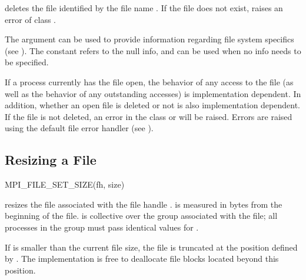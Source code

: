  deletes the file
identified by the file name .
If the file does not exist,  raises an
error of class .

The  argument can be used to provide information
regarding file system specifics
(see ).
The constant 
refers to the null info, and
can be used when no info needs to be specified.

If a process currently has the file open,
the behavior of any access to the file
(as well as the behavior of any outstanding accesses)
is implementation dependent.
In addition, whether an open file is deleted or not is also
implementation dependent.
If the file is not deleted,
an error in the class
 or  will be raised.
Errors are raised 
using the default file error handler
(see ).

\subsection{Resizing a File}
\label{sec:io-filecntl-resize}

%
%
\begin{funcdef}{MPI\_FILE\_SET\_SIZE}{(\mbox{fh}, \mbox{size})}
\end{funcdef}

 resizes the file
associated with the file handle .
 is measured in bytes from the beginning of the file.
 is collective over the group associated with the file;
all processes in the group must pass identical values for .

If  is smaller than the current file size,
the file is truncated at the position defined by .
The implementation is free to deallocate file blocks located
beyond this position.


